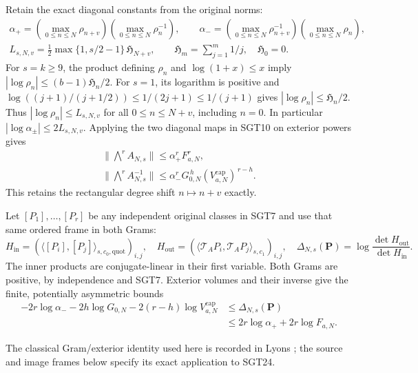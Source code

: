 \documentclass[11pt,a4paper]{article}
\begin{document}
Retain the exact diagonal constants from the original norms:
\[
\begin{gathered}
 \alpha_+=
  \left(\max_{0\le n\le N}\rho_{n+v}\right)
  \left(\max_{0\le n\le N}\rho_n^{-1}\right),\qquad
 \alpha_-=
  \left(\max_{0\le n\le N}\rho_{n+v}^{-1}\right)
  \left(\max_{0\le n\le N}\rho_n\right),\\
 L_{s,N,v}=\tfrac12\max\{1,s/2-1\}\,\mathfrak H_{N+v},
 \qquad \mathfrak H_m=\sum_{j=1}^m1/j,\quad\mathfrak H_0=0.
\end{gathered}\tag{SGT21}
\]
For $s=k\ge9$, the product defining $\rho_n$ and
$\log(1+x)\le x$ imply
$|\log\rho_n|\le(b-1)\mathfrak H_n/2$.
For $s=1$, its logarithm is positive and
$\log((j+1)/(j+1/2))\le1/(2j+1)\le1/(j+1)$ gives
$|\log\rho_n|\le\mathfrak H_n/2$.
Thus $|\log\rho_n|\le L_{s,N,v}$ for all $0\le n\le N+v$,
including $n=0$. In particular
$|\log\alpha_\pm|\le2L_{s,N,v}$.
Applying the two diagonal maps in SGT10 on exterior powers gives
\[
\begin{gathered}
 \|\bigwedge^r A_{N,s}\|
       \le\alpha_+^r F_{a,N}^r,\\
 \|\bigwedge^r A_{N,s}^{-1}\|
       \le\alpha_-^rG_{0,N}^{\,h}
                    (V_{a,N}^{\mathrm{cap}})^{\,r-h}.
\end{gathered}\tag{SGT22}
\]
This retains the rectangular degree shift $n\mapsto n+v$ exactly.

Let $[P_1],\ldots,[P_r]$ be any independent original classes in
SGT7 and use that same ordered frame in both Grams:
\[
 H_{\mathrm{in}}=
    (\langle[P_i],[P_j]\rangle_{s,c_0,\mathrm{quot}})_{i,j},
 \quad
 H_{\mathrm{out}}=
    (\langle\mathcal T_AP_i,\mathcal T_AP_j\rangle_{s,c_1})_{i,j},
 \quad
 \Delta_{N,s}(\mathbf P)=
          \log\frac{\det H_{\mathrm{out}}}{\det H_{\mathrm{in}}}.
 \tag{SGT23}
\]
The inner products are conjugate-linear in their first variable.
Both Grams are positive, by independence and SGT7. Exterior
volumes and their inverse give the finite, potentially asymmetric bounds
\[
\begin{split}
 -2r\log\alpha_- -2h\log G_{0,N}
            -2(r-h)\log V_{a,N}^{\mathrm{cap}}
 &\le\Delta_{N,s}(\mathbf P)\\
 &\le2r\log\alpha_+ +2r\log F_{a,N}.
\end{split}\tag{SGT24}
\]


The classical Gram/exterior identity used here is recorded in
Lyons \cite[\S4, (4.1), p.~11]{human:lyons2003}; the source and
image frames below specify its exact application to SGT24.
\end{document}
